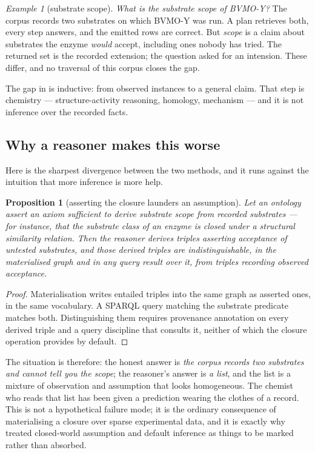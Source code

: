 \documentclass[11pt,a4paper]{article}
\theoremstyle{plain}
\newtheorem{proposition}[theorem]{Proposition}
\theoremstyle{definition}
\theoremstyle{remark}
\newtheorem{example}[theorem]{Example}
\begin{document}
\begin{example}[substrate scope]
\label{ex:scope}
\emph{What is the substrate scope of BVMO-Y?} The corpus records two
substrates on which BVMO-Y was run. A plan retrieves both, every step
answers, and the emitted rows are correct. But \emph{scope} is a claim
about substrates the enzyme \emph{would} accept, including ones nobody
has tried. The returned set is the recorded extension; the question
asked for an intension. These differ, and no traversal of this corpus
closes the gap.
\end{example}

The gap in  is inductive: from observed instances to a
general claim. That step is chemistry --- structure-activity reasoning,
homology, mechanism --- and it is not inference over the recorded facts.

\subsection{Why a reasoner makes this worse}

Here is the sharpest divergence between the two methods, and it runs
against the intuition that more inference is more help.

\begin{proposition}[asserting the closure launders an assumption]
\label{prop:launder}
Let an ontology assert an axiom sufficient to derive substrate scope
from recorded substrates --- for instance, that the substrate class of
an enzyme is closed under a structural similarity relation. Then the
reasoner derives triples asserting acceptance of untested substrates,
and those derived triples are indistinguishable, in the materialised
graph and in any query result over it, from triples recording observed
acceptance.
\end{proposition}

\begin{proof}
Materialisation writes entailed triples into the same graph as asserted
ones, in the same vocabulary. A SPARQL query matching the substrate
predicate matches both. Distinguishing them requires provenance
annotation on every derived triple and a query discipline that consults
it, neither of which the closure operation provides by default.
\end{proof}

The situation is therefore: the honest answer is \emph{the corpus
records two substrates and cannot tell you the scope}; the reasoner's
answer is \emph{a list}, and the list is a mixture of observation and
assumption that looks homogeneous. The chemist who reads that list has
been given a prediction wearing the clothes of a record. This is not a
hypothetical failure mode; it is the ordinary consequence of
materialising a closure over sparse experimental data, and it is exactly
why \citet{Reiter1978,Reiter1980} treated closed-world assumption and
default inference as things to be marked rather than absorbed.
\end{document}
